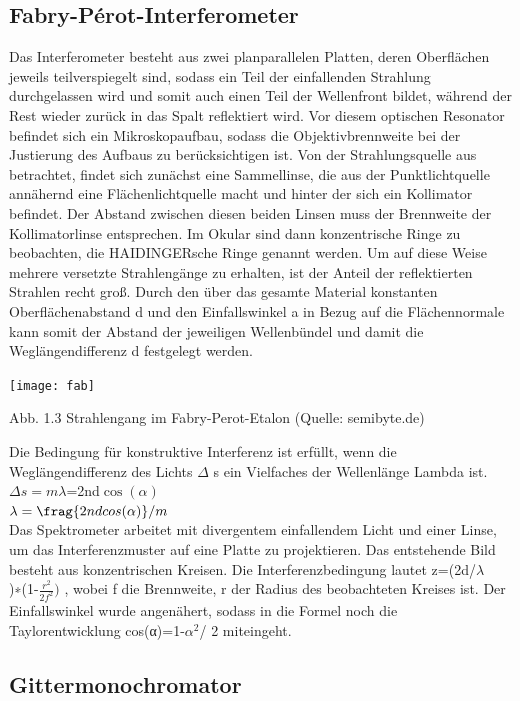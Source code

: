 \documentclass[10pt,a4paper]{article}
\begin{document}
\subsection{ Fabry-Pérot-Interferometer} 

Das Interferometer besteht aus zwei planparallelen Platten, deren Oberflächen jeweils teilverspiegelt sind, sodass ein Teil der einfallenden Strahlung durchgelassen wird und somit auch einen Teil der Wellenfront bildet, während der Rest wieder zurück in das Spalt reflektiert wird. Vor diesem optischen Resonator befindet sich ein Mikroskopaufbau, sodass die Objektivbrennweite bei der Justierung des Aufbaus zu berücksichtigen ist. Von der Strahlungsquelle aus betrachtet, findet sich zunächst eine Sammellinse, die aus der Punktlichtquelle annähernd eine Flächenlichtquelle macht und hinter der sich ein Kollimator befindet. Der Abstand zwischen diesen beiden Linsen muss der Brennweite der Kollimatorlinse entsprechen. Im Okular sind dann konzentrische Ringe zu beobachten, die HAIDINGERsche Ringe genannt werden. Um auf diese Weise mehrere versetzte Strahlengänge zu erhalten, ist der Anteil der reflektierten Strahlen recht groß. Durch den über das gesamte Material konstanten Oberflächenabstand d und den Einfallswinkel a in Bezug auf die Flächennormale kann somit der Abstand der jeweiligen Wellenbündel und damit die Weglängendifferenz d festgelegt werden.


\texttt{[image: fab]}

Abb. 1.3 Strahlengang im Fabry-Perot-Etalon (Quelle: semibyte.de)


Die Bedingung für konstruktive Interferenz ist erfüllt, wenn die Weglängendifferenz des Lichts $\Delta$ s ein Vielfaches der Wellenlänge Lambda ist.\\

$\Delta s=m\lambda$=2nd$\cos(\alpha)$\\

$\lambda= \frag{2ndcos(\alpha)}/ {m} $\\

Das Spektrometer arbeitet mit divergentem einfallendem Licht und einer Linse, um das Interferenzmuster auf eine Platte zu projektieren. Das entstehende Bild besteht aus konzentrischen Kreisen. 
Die Interferenzbedingung lautet z=(2d/$\lambda$ )∗(1-$\frac{r^2} {2f^2} )$ , wobei f die Brennweite, r der Radius des beobachteten Kreises ist. Der Einfallswinkel wurde angenähert, sodass in die Formel noch die Taylorentwicklung cos(α)=1-$\alpha^2$/ 2 miteingeht.

\subsection{ Gittermonochromator}
\end{document}

